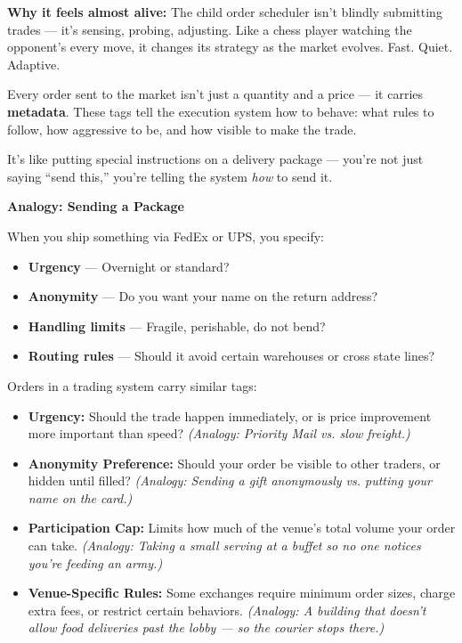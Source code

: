 \medskip

\textbf{Why it feels almost alive:}  
The child order scheduler isn’t blindly submitting trades — it’s sensing, probing, adjusting. Like a chess player watching the opponent’s every move, it changes its strategy as the market evolves. Fast. Quiet. Adaptive.







Every order sent to the market isn’t just a quantity and a price — it carries \textbf{metadata}.  
These tags tell the execution system how to behave: what rules to follow, how aggressive to be, and how visible to make the trade.

It’s like putting special instructions on a delivery package — you’re not just saying “send this,” you’re telling the system \textit{how} to send it.

\medskip

\textbf{Analogy: Sending a Package}

When you ship something via FedEx or UPS, you specify:

\begin{itemize}
  \item \textbf{Urgency} — Overnight or standard?  
  \item \textbf{Anonymity} — Do you want your name on the return address?  
  \item \textbf{Handling limits} — Fragile, perishable, do not bend?  
  \item \textbf{Routing rules} — Should it avoid certain warehouses or cross state lines?
\end{itemize}

Orders in a trading system carry similar tags:

\begin{itemize}
  \item \textbf{Urgency:}  
  Should the trade happen immediately, or is price improvement more important than speed?  
  \textit{(Analogy: Priority Mail vs. slow freight.)}

  \item \textbf{Anonymity Preference:}  
  Should your order be visible to other traders, or hidden until filled?  
  \textit{(Analogy: Sending a gift anonymously vs. putting your name on the card.)}

  \item \textbf{Participation Cap:}  
  Limits how much of the venue’s total volume your order can take.  
  \textit{(Analogy: Taking a small serving at a buffet so no one notices you’re feeding an army.)}

  \item \textbf{Venue-Specific Rules:}  
  Some exchanges require minimum order sizes, charge extra fees, or restrict certain behaviors.  
  \textit{(Analogy: A building that doesn’t allow food deliveries past the lobby — so the courier stops there.)}
\end{itemize}

